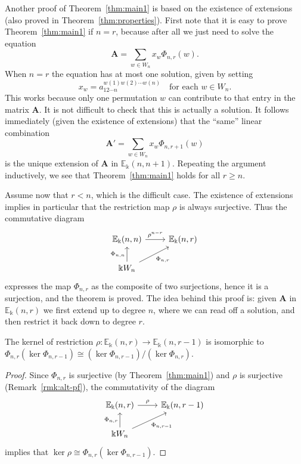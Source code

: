 \documentclass[ALCO,ThmDefs,Unicode,epreuves]{cedram}
\newcommand{\E}{\mathbb{E}}
\newcommand{\bA}{\mathbf{A}}
\begin{document}
\begin{rema}\label{rmk:alt-pf}
Another proof of Theorem~\ref{thm:main1} is based on the existence of
extensions (also proved in Theorem~\ref{thm:properties}). First note
that it is easy to prove Theorem~\ref{thm:main1} if $n=r$, because
after all we just need to solve the equation
\[
\bA = \textstyle \sum_{w \in W_n} x_w \Phi_{n,r}(w). 
\]
When $n=r$ the equation has at most one solution, given by setting
\[
x_w = a_{12\cdots n}^{w(1)w(2)\cdots w(n)} \quad \text{for each $w \in W_n$}.
\]
This works because only one permutation $w$ can contribute to that
entry in the matrix $\bA$. It is not difficult to check that this is
actually a solution. It follows immediately (given the existence of
extensions) that the ``same'' linear combination
\[
\bA' = \sum_{w \in W_n} x_w \Phi_{n,r+1}(w)
\]
is the unique extension of $\bA$ in $\E_\Bbbk(n,n+1)$. Repeating the
argument inductively, we see that Theorem~\ref{thm:main1} holds for
all $r \ge n$.

Assume now that $r<n$, which is the difficult case. The existence of
extensions implies in particular that the restriction map $\rho$ is
always surjective. Thus the commutative diagram
\[
\begin{tikzcd}
\E_\Bbbk(n,n) \arrow[r, "\rho^{n-r}"] & \E_\Bbbk(n,r) \\
\Bbbk W_n \arrow[u, "\Phi_{n,n}"] \arrow[ur, "\Phi_{n,r}"']
\end{tikzcd}
\]
expresses the map $\Phi_{n,r}$ as the composite of two surjections,
hence it is a surjection, and the theorem is proved. The idea behind
this proof is: given $\bA$ in $\E_\Bbbk(n,r)$ we first extend up to
degree $n$, where we can read off a solution, and then restrict it
back down to degree $r$.
\end{rema}



\begin{coro}\label{cor:ker-of-rho}
 The kernel of restriction $\rho: \E_\Bbbk(n,r) \to \E_\Bbbk(n,r-1)$
 is isomorphic to $\Phi_{n,r}(\ker \Phi_{n,r-1}) \cong (\ker
 \Phi_{n,r-1})/(\ker \Phi_{n,r})$.
\end{coro}

\begin{proof}
Since $\Phi_{n,r}$ is surjective (by Theorem~\ref{thm:main1}) and
$\rho$ is surjective (Remark~\ref{rmk:alt-pf}), the commutativity of
the diagram
\[
\begin{tikzcd}
\E_\Bbbk(n,r) \arrow[r, "\rho"] & \E_\Bbbk(n,r-1) \\
\Bbbk W_n \arrow[u, "\Phi_{n,r}"] \arrow[ur, "\Phi_{n,r-1}"']
\end{tikzcd}
\]
implies that $\ker \rho \cong \Phi_{n,r}(\ker \Phi_{n,r-1})$. 
\end{proof}
\end{document}
